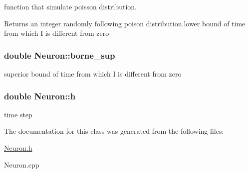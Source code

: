 function that simulate poisson distribution. 

\begin{DoxyReturn}{Returns}
an integer randomly following poison distribution.\-lower bound of time from which I is different from zero 
\end{DoxyReturn}
\hypertarget{classNeuron_af8db865bd7e1f841035fbd99c821dbed}{
\subsubsection[{borne\-\_\-sup}]{\setlength{\rightskip}{0pt plus 5cm}double Neuron\-::borne\-\_\-sup}}\label{classNeuron_af8db865bd7e1f841035fbd99c821dbed}
superior bound of time from which I is different from zero \hypertarget{classNeuron_ae540cc540666b20457f914d7116eea24}{
\subsubsection[{h}]{\setlength{\rightskip}{0pt plus 5cm}double Neuron\-::h}}\label{classNeuron_ae540cc540666b20457f914d7116eea24}
time step 

The documentation for this class was generated from the following files\-:\begin{DoxyCompactItemize}
\item 
\hyperlink{Neuron_8h}{Neuron.\-h}\item 
Neuron.\-cpp\end{DoxyCompactItemize}
